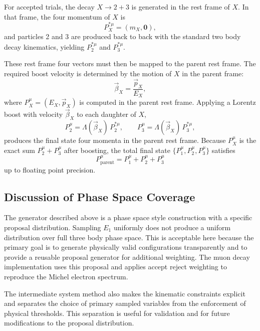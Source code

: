 \documentclass[11pt,a4paper]{article}
\begin{document}
For accepted trials, the decay $X \rightarrow 2 + 3$ is generated in the rest frame of $X$.
In that frame, the four momentum of $X$ is
\begin{equation}
P_X^{\ast \mu} = (m_X, \mathbf{0}) ,
\end{equation}
and particles 2 and 3 are produced back to back with the standard two body decay kinematics,
yielding $P_2^{\ast \mu}$ and $P_3^{\ast \mu}$.

These rest frame four vectors must then be mapped to the parent rest frame. The required
boost velocity is determined by the motion of $X$ in the parent frame:
\begin{equation}
\vec{\beta}_X = \frac{\vec{p}_X}{E_X} ,
\end{equation}
where $P_X^\mu = (E_X, \vec{p}_X)$ is computed in the parent rest frame. Applying a Lorentz
boost with velocity $\vec{\beta}_X$ to each daughter of $X$,
\begin{equation}
P_2^\mu = \Lambda(\vec{\beta}_X)\, P_2^{\ast \mu}, \qquad
P_3^\mu = \Lambda(\vec{\beta}_X)\, P_3^{\ast \mu},
\end{equation}
produces the final state four momenta in the parent rest frame. Because $P_X^\mu$ is the
exact sum $P_2^\mu + P_3^\mu$ after boosting, the total final state
$\{P_1^\mu, P_2^\mu, P_3^\mu\}$ satisfies
\begin{equation}
P_{\text{parent}}^\mu = P_1^\mu + P_2^\mu + P_3^\mu
\end{equation}
up to floating point precision.

\subsection{Discussion of Phase Space Coverage}

The generator described above is a phase space style construction with a specific proposal
distribution. Sampling $E_1$ uniformly does not produce a uniform distribution over full
three body phase space. This is acceptable here because the primary goal is to generate
physically valid configurations transparently and to provide a reusable proposal generator
for additional weighting. The muon decay implementation uses this proposal and applies
accept reject weighting to reproduce the Michel electron spectrum.

The intermediate system method also makes the kinematic constraints explicit and separates
the choice of primary sampled variables from the enforcement of physical thresholds. This
separation is useful for validation and for future modifications to the proposal distribution.
\end{document}
